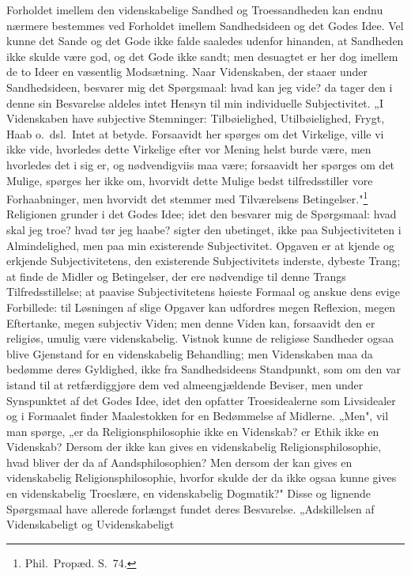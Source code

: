 \documentclass[12pt]{book}
\begin{document}
Forholdet imellem den videnskabelige Sandhed og Troessandheden kan endnu nærmere
bestemmes ved Forholdet imellem Sandhedsideen og det Godes Idee. Vel kunne det
Sande og det Gode ikke falde saaledes udenfor hinanden, at Sandheden ikke skulde
være god, og det Gode ikke sandt; men desuagtet er her dog imellem de to Ideer en
væsentlig Modsætning. Naar Videnskaben, der staaer under Sandhedsideen, besvarer
mig det Spørgsmaal: hvad kan jeg vide? da tager den i denne sin Besvarelse aldeles
intet Hensyn til min individuelle Subjectivitet. „I Videnskaben have subjective
Stemninger: Tilbøielighed, Utilbøielighed, Frygt, Haab o.\ dsl.\ Intet at betyde.
Forsaavidt her spørges om det Virkelige, ville vi ikke vide, hvorledes dette
Virkelige efter vor Mening helst burde være, men hvorledes det i sig er, og
nødvendigviis maa være; forsaavidt her spørges om det Mulige, spørges her ikke om,
hvorvidt dette Mulige bedst tilfredsstiller vore Forhaabninger, men hvorvidt det
stemmer med Tilværelsens Betingelser."\footnote{Phil.\ Propæd. S.~74.} Religionen
grunder i det Godes Idee; idet den besvarer mig de Spørgsmaal: hvad skal jeg troe?
hvad tør jeg haabe? sigter den ubetinget, ikke paa Subjectiviteten i
Almindelighed, men paa min existerende Subjectivitet. Opgaven er at kjende og
erkjende Subjectivitetens, den existerende Subjectivitets inderste, dybeste Trang;
at finde de Midler og Betingelser, der ere nødvendige til denne Trangs
Tilfredsstillelse; at paavise Subjectivitetens høieste Formaal og anskue dens evige
Forbillede: til Løsningen af slige Opgaver kan udfordres megen
Reflexion, megen Eftertanke, megen subjectiv Viden; men denne Viden kan, forsaavidt
den er religiøs, umulig være videnskabelig. Vistnok kunne de religiøse Sandheder
ogsaa blive Gjenstand for en videnskabelig Behandling; men Videnskaben maa da
bedømme deres Gyldighed, ikke fra Sandhedsideens Standpunkt, som om den var istand
til at retfærdiggjøre dem ved almeengjældende Beviser, men under Synspunktet af det
Godes Idee, idet den opfatter Troesidealerne som Livsidealer og i Formaalet finder
Maalestokken for en Bedømmelse af Midlerne. „Men", vil man spørge, „er da
Religionsphilosophie ikke en Videnskab? er Ethik ikke en Videnskab? Dersom der ikke
kan gives en videnskabelig Religionsphilosophie, hvad bliver der da af
Aandsphilosophien? Men dersom der kan gives en videnskabelig Religionsphilosophie,
hvorfor skulde der da ikke ogsaa kunne gives en videnskabelig Troeslære, en
videnskabelig Dogmatik?" Disse og lignende Spørgsmaal have allerede forlængst
fundet deres Besvarelse. „Adskillelsen af Videnskabeligt og Uvidenskabeligt
\end{document}
